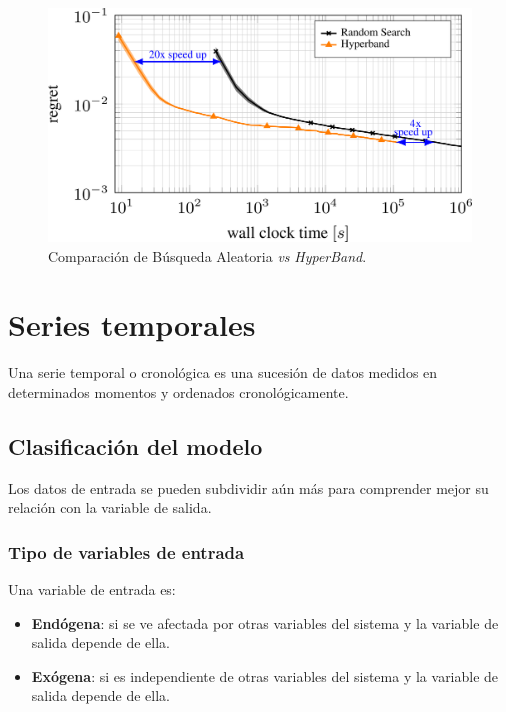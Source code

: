 \documentclass[a4paper,12pt]{article}
\begin{document}
\begin{figure}[H]
	\begin{center}
		\includegraphics[width=1\textwidth]{comparison_rs_hb.png}
		\caption{Comparación de Búsqueda Aleatoria \textit{vs} \textit{HyperBand}.\citep{automl-bohb}}
		\label{fig:rs_vs_hb}
	\end{center}
\end{figure}

\clearpage

\section{Series temporales}

Una serie temporal o cronológica es una sucesión de datos medidos en determinados momentos y ordenados cronológicamente. \citep{Agrawal2019Mar}

\subsection{Clasificación del modelo}

Los datos de entrada se pueden subdividir aún más para comprender mejor su relación con la variable de salida.

\subsubsection{Tipo de variables de entrada}

Una variable de entrada es:
\begin{itemize}[noitemsep, topsep=2pt]
	\item \textbf{Endógena}: si se ve afectada por otras variables del sistema y la variable de salida depende de ella.
	\item \textbf{Exógena}: si es independiente de otras variables del sistema y la variable de salida depende de ella.
\end{itemize}
\end{document}

